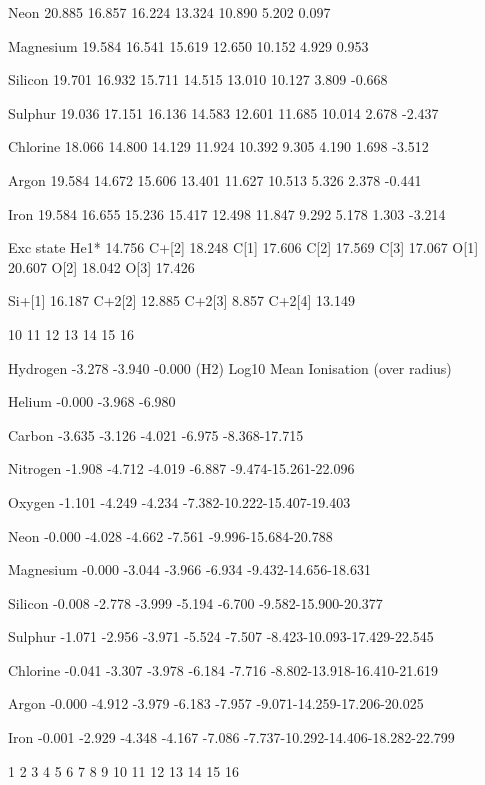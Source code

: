 { Neon       20.885 16.857 16.224 13.324 10.890  5.202  0.097

 Magnesium  19.584 16.541 15.619 12.650 10.152  4.929  0.953

 Silicon    19.701 16.932 15.711 14.515 13.010 10.127  3.809 -0.668

 Sulphur    19.036 17.151 16.136 14.583 12.601 11.685 10.014  2.678 -2.437

 Chlorine   18.066 14.800 14.129 11.924 10.392  9.305  4.190  1.698 -3.512

 Argon      19.584 14.672 15.606 13.401 11.627 10.513  5.326  2.378 -0.441

 Iron       19.584 16.655 15.236 15.417 12.498 11.847  9.292  5.178  1.303
-3.214

 Exc state    He1* 14.756   C+[2] 18.248   C[1] 17.606   C[2] 17.569   C[3]
17.067   O[1] 20.607   O[2] 18.042   O[3] 17.426

              Si+[1] 16.187   C+2[2] 12.885   C+2[3]  8.857   C+2[4] 13.149

10     11     12     13     14     15     16    

 Hydrogen   -3.278 -3.940 -0.000 (H2)                 Log10 Mean Ionisation
(over radius)

 Helium     -0.000 -3.968 -6.980

 Carbon     -3.635 -3.126 -4.021 -6.975 -8.368-17.715

 Nitrogen   -1.908 -4.712 -4.019 -6.887 -9.474-15.261-22.096

 Oxygen     -1.101 -4.249 -4.234 -7.382-10.222-15.407-19.403

 Neon       -0.000 -4.028 -4.662 -7.561 -9.996-15.684-20.788

 Magnesium  -0.000 -3.044 -3.966 -6.934 -9.432-14.656-18.631

 Silicon    -0.008 -2.778 -3.999 -5.194 -6.700 -9.582-15.900-20.377

 Sulphur    -1.071 -2.956 -3.971 -5.524 -7.507 -8.423-10.093-17.429-22.545

 Chlorine   -0.041 -3.307 -3.978 -6.184 -7.716 -8.802-13.918-16.410-21.619

 Argon      -0.000 -4.912 -3.979 -6.183 -7.957 -9.071-14.259-17.206-20.025

 Iron       -0.001 -2.929 -4.348 -4.167 -7.086
-7.737-10.292-14.406-18.282-22.799

               1      2      3      4      5      6      7      8      9
10     11     12     13     14     15     16    

}
